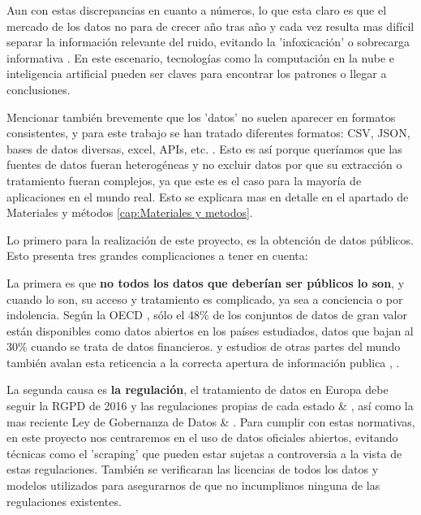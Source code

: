 Aun con estas discrepancias en cuanto a números, lo que esta claro es que el mercado de los datos no para de crecer año tras año y cada vez resulta mas difícil separar la información relevante del ruido, evitando la 'infoxicación' o sobrecarga informativa \citep{Infoxicacion}. En este escenario, tecnologías como la computación en la nube e inteligencia artificial pueden ser claves para encontrar los patrones o llegar a conclusiones.

Mencionar también brevemente que los 'datos' no suelen aparecer en formatos consistentes, y para este trabajo se han tratado diferentes formatos: CSV, JSON, bases de datos diversas, excel, APIs, etc. \citep{khan2019fileFormats}. Esto es así porque queríamos que las fuentes de datos fueran heterogéneas y no excluir datos por que su extracción o tratamiento fueran complejos, ya que este es el caso para la mayoría de aplicaciones en el mundo real. Esto se explicara mas en detalle en el apartado de Materiales y métodos \ref{cap:Materiales y metodos}.

Lo primero para la realización de este proyecto, es la obtención de datos públicos. Esto presenta tres grandes complicaciones a tener en cuenta:

La primera es que \textbf{no todos los datos que deberían ser públicos lo son}, y cuando lo son, su acceso y tratamiento es complicado, ya sea a conciencia o por indolencia. Según la OECD \citep{OECD2023openData}, sólo el 48\% de los conjuntos de datos de gran valor están disponibles como datos abiertos en los países estudiados, datos que bajan al 30\% cuando se trata de datos financieros. y estudios de otras partes del mundo también avalan esta reticencia a la correcta apertura de información publica \citep{TransparenciaEcuador}, \citep{TransparenciaMexico}.


La segunda causa es \textbf{la regulación}, el tratamiento de datos en Europa debe seguir la RGPD de 2016 y las regulaciones propias de cada estado \citep{LicenciasLibres2017Datos} \& \citep{webRGPD2016Europa}, así como la mas reciente Ley de Gobernanza de Datos \citep{webLGD2023Europa} \& \citep{DatosAbiertos2022Cloud}. Para cumplir con estas normativas, en este proyecto nos centraremos en el uso de datos oficiales abiertos, evitando técnicas como el 'scraping' que pueden estar sujetas a controversia a la vista de estas regulaciones. También se verificaran las licencias de todos los datos y modelos utilizados para asegurarnos de que no incumplimos ninguna de las regulaciones existentes.

